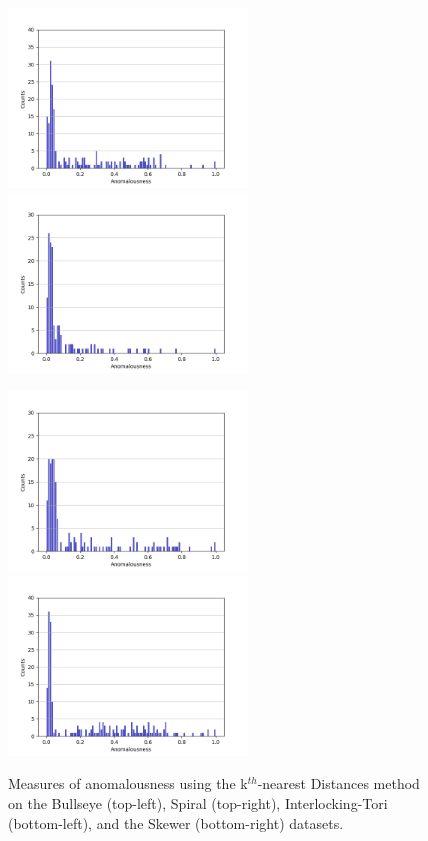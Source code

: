 \begin{figure}[!t]
\centering
\includegraphics[width=2.5in]{static/bullseye_kth_nearest.png}\includegraphics[width=2.5in]{static/spiral_kth_nearest.png}

\includegraphics[width=2.5in]{static/interlocking_tori_kth_nearest.png}\includegraphics[width=2.5in]{static/skewer_kth_nearest.png}

\caption{
Measures of anomalousness using the k$^{th}$-nearest Distances method on the Bullseye (top-left), Spiral (top-right), Interlocking-Tori (bottom-left), and the Skewer (bottom-right) datasets.
}

\label{results:histograms:kth_nearest}
\end{figure}

